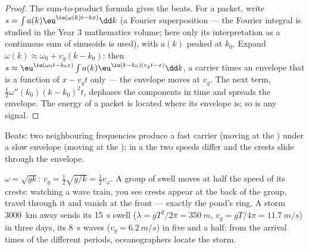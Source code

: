 \begin{proof}
The sum-to-product formula gives the beats. For a packet, write $s =
\int a(k)\eu^{\iu(\omega(k)t - kx)}\dd k$ (a Fourier superposition --- the
Fourier integral is studied in the Year 3 mathematics volume; here only
its interpretation as a continuous sum of sinusoids is used), with
$a(k)$ peaked at $k_0$. Expand $\omega(k) \approx \omega_0 + v_g(k - k_0)$: then
$s \approx \eu^{\iu(\omega_0t - k_0x)}\int a(k)\eu^{\iu(k - k_0)(v_gt - x)}\dd k$, a
carrier times an envelope that is a function of $x - v_gt$ only --- the
envelope moves at $v_g$. The next term, $\tfrac12\omega''(k_0)(k - k_0)^2t$,
dephases the components in time and spreads the envelope. The energy
of a packet is located where its envelope is; so is any signal.
\end{proof}

\begin{omfigure}

{\small Beats: two neighbouring frequencies produce a fast carrier
(moving at the ) under a slow envelope (moving at the
); in a  the two speeds differ and the
crests slide through the envelope.}
\end{omfigure}

\begin{example}\label{ex:b2:dispersion-wave-packets:deepwater}
$\omega = \sqrt{gk}$: $v_g = \tfrac12\sqrt{g/k} = \tfrac12v_\varphi$. A group of
swell moves at half the speed of its crests: watching a wave train,
you see crests appear at the back of the group, travel through it and
vanish at the front --- exactly the pond's ring. A storm \qty{3000}{km}
away sends its \qty{15}{s} swell ($\lambda = gT^2/2\pi = \qty{350}{m}$, $v_g =
gT/4\pi = \qty{11.7}{m/s}$) in three days, its \qty{8}{s} waves ($v_g =
\qty{6.2}{m/s}$) in five and a half: from the arrival times of the
different periods, oceanographers locate the storm.
\end{example}

